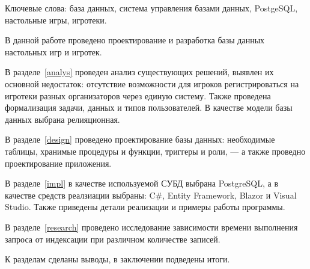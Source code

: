 \begin{essay}{}
    Ключевые слова: база данных, система управления базами данных, PostgeSQL,
    настольные игры, игротеки.

    В данной работе проведено проектирование и разработка базы данных настольных
    игр и игротек. 

    В разделе~\ref{analys} проведен анализ существующих решений, выявлен их
    основной недостаток: отсутствие возможности для игроков регистрироваться на
    игротеки разных организаторов через единую систему. Также проведена
    формализация задачи, данных и типов пользователей. В качестве модели базы
    данных выбрана релияционная.

    В разделе~\ref{design} проведено проектирование базы данных: необходимые
    таблицы, хранимые процедуры и функции, триггеры и роли, --- а также проведно
    проектирование приложения.

    В разделе~\ref{impl} в качестве используемой СУБД выбрана PostgreSQL, а в
    качестве средств реалзиации выбраны: C\#, Entity Framework, Blazor и Visual
    Studio. Также приведены детали реализации и примеры работы программы.

    В разделе~\ref{research} проведено исследование зависимости времени
    выполнения запроса от индексации при различном количестве записей.

    К разделам сделаны выводы, в заключении подведены итоги.
\end{essay}
